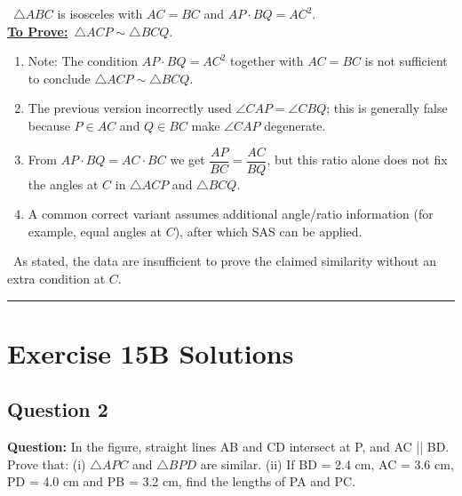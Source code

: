 \documentclass{article}
\newenvironment{steps}{%
  \begin{enumerate}[label=\textcolor{primary}{Step~\arabic*:}, leftmargin=*]
}{\end{enumerate}}
\newcommand{\sul}[1]{\uline{#1}}
\newcommand{\dul}[1]{\uuline{#1}}
\newcommand{\solutionheading}{{\raggedright\dul{\textbf{Solution}}\par}}
\newcommand{\given}[1]{\noindent\textbf{\textcolor{secondary}{\dul{Given:}}}~#1\\}
\newcommand{\toprove}[1]{\noindent\textbf{\textcolor{primary}{\sul{To Prove:}}}~#1\\}
\newcommand{\solutionrule}{\par\noindent\color{accent}\rule{\linewidth}{0.6pt}\par\smallskip}
\newcommand{\finalanswer}[1]{\noindent\textbf{\textcolor{accent}{\dul{Answer:}}}~#1\solutionrule}
\begin{document}
\solutionheading
\given{$\triangle ABC$ is isosceles with $AC=BC$ and $AP\cdot BQ = AC^2$.}
\toprove{$\triangle ACP \sim \triangle BCQ$.}

\begin{center}
\end{center}

\begin{steps}
  \item Note: The condition $AP\cdot BQ=AC^2$ together with $AC=BC$ is not sufficient to conclude $\triangle ACP\sim\triangle BCQ$.
  \item The previous version incorrectly used $\angle CAP=\angle CBQ$; this is generally false because $P\in AC$ and $Q\in BC$ make $\angle CAP$ degenerate.
  \item From $AP\cdot BQ=AC\cdot BC$ we get $\dfrac{AP}{BC}=\dfrac{AC}{BQ}$, but this ratio alone does not fix the angles at $C$ in $\triangle ACP$ and $\triangle BCQ$.
  \item A common correct variant assumes additional angle/ratio information (for example, equal angles at $C$), after which SAS can be applied.
\end{steps}

\finalanswer{As stated, the data are insufficient to prove the claimed similarity without an extra condition at $C$.}

\newpage
\section*{Exercise 15B Solutions}

\subsection*{Question 2}
\textbf{Question:} In the figure, straight lines AB and CD intersect at P, and AC || BD. Prove that: (i) $\triangle APC$ and $\triangle BPD$ are similar. (ii) If BD = 2.4 cm, AC = 3.6 cm, PD = 4.0 cm and PB = 3.2 cm, find the lengths of PA and PC.
\end{document}
